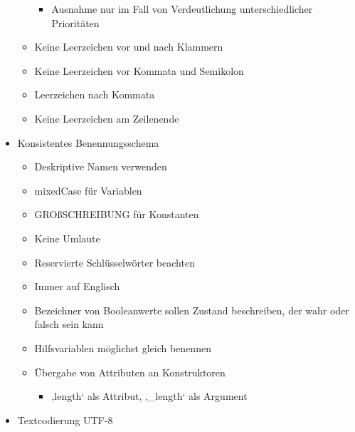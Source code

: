 \documentclass[twoside]{report}
\begin{document}
\begin{itemize}
\begin{itemize}
\begin{itemize}
	\item Ausnahme nur im Fall von Verdeutlichung unterschiedlicher Prioritäten\par


\end{itemize}
	\item Keine Leerzeichen vor und nach Klammern\par

	\item Keine Leerzeichen vor Kommata und Semikolon\par

	\item Leerzeichen nach Kommata\par

	\item Keine Leerzeichen am Zeilenende\par


\end{itemize}
	\item Konsistentes Benennungsschema\par

\begin{itemize}
	\item Deskriptive Namen verwenden\par

	\item mixedCase für Variablen\par

	\item GROßSCHREIBUNG für Konstanten\par

	\item Keine Umlaute\par

	\item Reservierte Schlüsselwörter beachten\par

	\item Immer auf Englisch\par

	\item Bezeichner von Booleanwerte sollen Zustand beschreiben, der wahr oder falsch sein kann\par

	\item Hilfsvariablen möglichst gleich benennen\par

	\item Übergabe von Attributen an Konstruktoren\par

\begin{itemize}
	\item ‚length‘ als Attribut, ‚\_length‘ als Argument\par


\end{itemize}
\end{itemize}
	\item Textcodierung UTF-8
\end{itemize}\par
\end{document}
